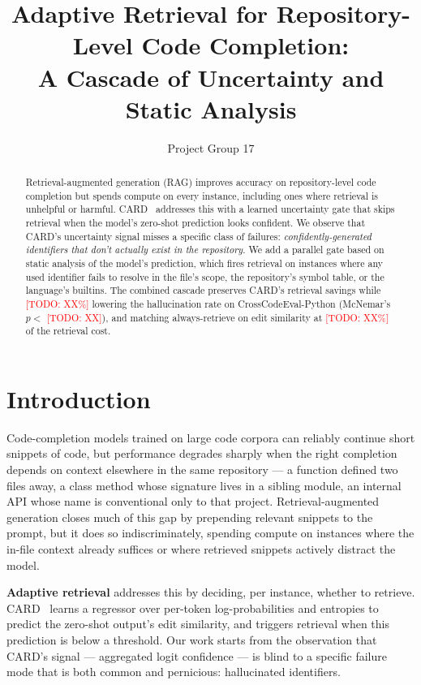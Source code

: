 \documentclass[10pt,twocolumn]{article}
\title{Adaptive Retrieval for Repository-Level Code Completion:\\
A Cascade of Uncertainty and Static Analysis}
\author{Project Group 17\\
}
\date{}
\newcommand{\todo}[1]{\textcolor{red}{[TODO: #1]}}
\begin{document}
\maketitle

\begin{abstract}
Retrieval-augmented generation (RAG) improves accuracy on repository-level
code completion but spends compute on every instance, including ones where
retrieval is unhelpful or harmful. CARD~\cite{zhang2024card} addresses this
with a learned uncertainty gate that skips retrieval when the model's
zero-shot prediction looks confident. We observe that CARD's uncertainty
signal misses a specific class of failures: \emph{confidently-generated
identifiers that don't actually exist in the repository}. We add a parallel
gate based on static analysis of the model's prediction, which fires
retrieval on instances where any used identifier fails to resolve in the
file's scope, the repository's symbol table, or the language's builtins. The
combined cascade preserves CARD's retrieval savings while
\todo{XX\%} lowering the hallucination rate on CrossCodeEval-Python
(McNemar's $p < $ \todo{XX}), and matching always-retrieve on edit
similarity at \todo{XX\%} of the retrieval cost.
\end{abstract}

\section{Introduction}

Code-completion models trained on large code corpora can reliably continue
short snippets of code, but performance degrades sharply when the right
completion depends on context elsewhere in the same repository --- a
function defined two files away, a class method whose signature lives in a
sibling module, an internal API whose name is conventional only to that
project. Retrieval-augmented generation closes much of this gap by
prepending relevant snippets to the prompt, but it does so indiscriminately,
spending compute on instances where the in-file context already suffices or
where retrieved snippets actively distract the model.

\textbf{Adaptive retrieval} addresses this by deciding, per instance,
whether to retrieve. CARD~\cite{zhang2024card} learns a regressor over
per-token log-probabilities and entropies to predict the zero-shot
output's edit similarity, and triggers retrieval when this prediction is
below a threshold. Our work starts from the observation that CARD's
signal --- aggregated logit confidence --- is blind to a specific failure
mode that is both common and pernicious: hallucinated identifiers.
\end{document}
